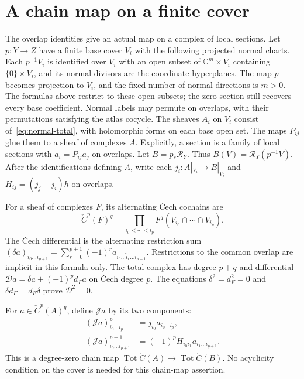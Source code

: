 \section{A chain map on a finite cover}
\label{sec:cech-map}

The overlap identities give an actual map on a complex of local sections.
Let $p:Y\to Z$ have a finite base cover $V_i$ with the following projected normal charts.
Each $p^{-1}V_i$ is identified over $V_i$ with an open subset of $\mathbb C^m\times V_i$
containing $\{0\}\times V_i$, and its normal divisors are the coordinate hyperplanes.
The map $p$ becomes projection to $V_i$, and the fixed number of normal directions is $m>0$.
The formulas above restrict to these open subsets; the zero section still recovers every base coefficient.
Normal labels may permute on overlaps, with their permutations satisfying the atlas cocycle.
The sheaves $A_i$ on $V_i$ consist of~\eqref{eq:normal-total}, with holomorphic forms on each base open set.
The maps $P_{ij}$ glue them to a sheaf of complexes $A$.
Explicitly, a section is a family of local sections with $a_i=P_{ij}a_j$ on overlaps.
Let $B=p_*\mathcal R_Y$.
Thus $B(V)=\mathcal R_Y(p^{-1}V)$.
After the identifications defining $A$, write each $j_i:A|_{V_i}\to B|_{V_i}$ and
$H_{ij}=(j_j-j_i)h$ on overlaps.

For a sheaf of complexes $F$, its alternating \v Cech cochains are
\[
\check C^p(F)^q=\prod_{i_0<\cdots<i_p}F^q(V_{i_0}\cap\cdots\cap V_{i_p}).
\]
The \v Cech differential is the alternating restriction sum
$(\delta a)_{i_0\ldots i_{p+1}}=
\sum_{r=0}^{p+1}(-1)^r a_{i_0\ldots\widehat i_r\ldots i_{p+1}}$.
Restrictions to the common overlap are implicit in this formula only.
The total complex has degree $p+q$ and differential
$\mathscr D a=\delta a+(-1)^p d_Fa$ on \v Cech degree $p$.
The equations $\delta^2=d_F^2=0$ and $\delta d_F=d_F\delta$ prove $\mathscr D^2=0$.

\begin{proposition}
\label{prop:cech-comparison}
For $a\in\check C^p(A)^q$, define $\mathcal J a$ by its two components:
\begin{align}
\label{eq:cech-comparison}
(\mathcal J a)^{p}_{i_0\ldots i_p}
&=j_{i_0}a_{i_0\ldots i_p},\\
(\mathcal J a)^{p+1}_{i_0\ldots i_{p+1}}
&=(-1)^p H_{i_0i_1}a_{i_1\ldots i_{p+1}}.
\end{align}
This is a degree-zero chain map
$\operatorname{Tot}\check C(A)\to\operatorname{Tot}\check C(B)$.
No acyclicity condition on the cover is needed for this chain-map assertion.
\end{proposition}

